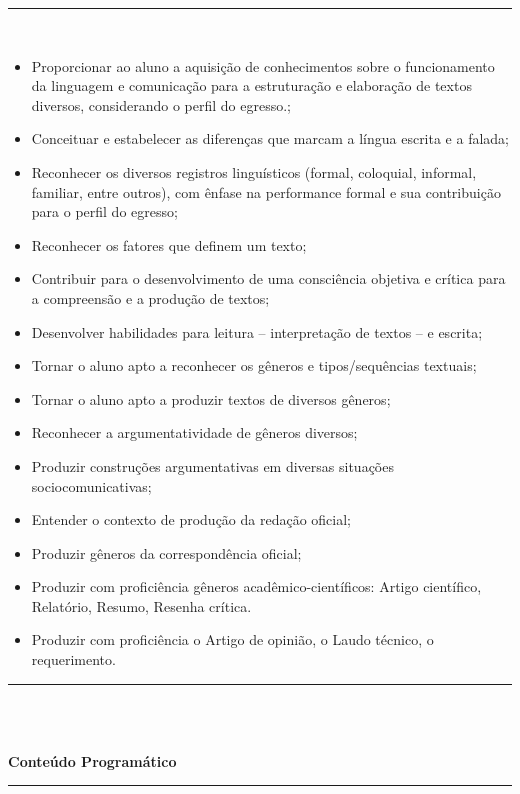 \vspace{-5mm}
\noindent\rule{16.5cm}{0.4pt}
\\
\begin{itemize}	
\item Proporcionar ao aluno a aquisição de conhecimentos sobre o funcionamento da linguagem e comunicação para a estruturação e elaboração de textos diversos, considerando o perfil do egresso.;
\item Conceituar e estabelecer as diferenças que marcam a língua escrita e a falada;
\item Reconhecer os diversos registros linguísticos (formal, coloquial, informal, familiar, entre outros), com ênfase na performance formal e sua contribuição para o perfil do egresso;
\item Reconhecer os fatores que definem um texto;
\item Contribuir para o desenvolvimento de uma consciência objetiva e crítica para a compreensão e a produção de textos;
\item Desenvolver habilidades para leitura – interpretação de textos – e escrita;
\item Tornar o aluno apto a reconhecer os gêneros e tipos/sequências textuais;
\item Tornar o aluno apto a produzir textos de diversos gêneros;
\item Reconhecer a argumentatividade de gêneros diversos;
\item Produzir construções argumentativas em diversas situações sociocomunicativas;
\item Entender o contexto de produção da redação oficial;
\item Produzir gêneros da correspondência oficial;
\item Produzir com proficiência gêneros acadêmico-científicos: Artigo científico, Relatório, Resumo, Resenha crítica.
\item Produzir com proficiência o Artigo de opinião, o Laudo técnico, o requerimento.
\end{itemize} 
\noindent\rule{16.5cm}{0.4pt}\\
\\
\vspace{-12mm}
\begin{center}\textbf{Conteúdo Programático}\end{center}
\vspace{-5mm}
\noindent\rule{16.5cm}{0.4pt}
